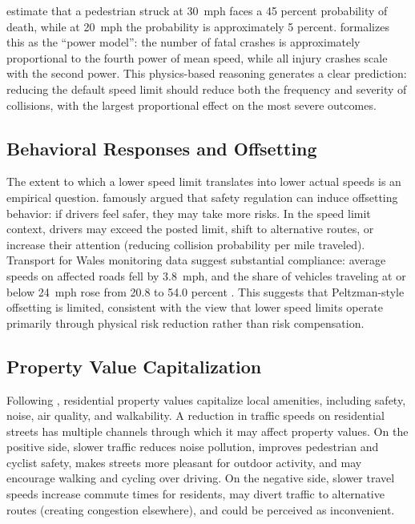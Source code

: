 \documentclass[12pt]{article}
\begin{document}
\citet{rosen2009} estimate that a pedestrian struck at 30~mph faces a 45 percent probability of death, while at 20~mph the probability is approximately 5 percent. \citet{elvik2009} formalizes this as the ``power model'': the number of fatal crashes is approximately proportional to the fourth power of mean speed, while all injury crashes scale with the second power. This physics-based reasoning generates a clear prediction: reducing the default speed limit should reduce both the frequency and severity of collisions, with the largest proportional effect on the most severe outcomes.

\subsection{Behavioral Responses and Offsetting}

The extent to which a lower speed limit translates into lower actual speeds is an empirical question. \citet{peltzman1975} famously argued that safety regulation can induce offsetting behavior: if drivers feel safer, they may take more risks. In the speed limit context, drivers may exceed the posted limit, shift to alternative routes, or increase their attention (reducing collision probability per mile traveled). Transport for Wales monitoring data suggest substantial compliance: average speeds on affected roads fell by 3.8~mph, and the share of vehicles traveling at or below 24~mph rose from 20.8 to 54.0 percent \citep{tfw2025}. This suggests that Peltzman-style offsetting is limited, consistent with the view that lower speed limits operate primarily through physical risk reduction rather than risk compensation.

\subsection{Property Value Capitalization}

Following \citet{rosen1974}, residential property values capitalize local amenities, including safety, noise, air quality, and walkability. A reduction in traffic speeds on residential streets has multiple channels through which it may affect property values. On the positive side, slower traffic reduces noise pollution, improves pedestrian and cyclist safety, makes streets more pleasant for outdoor activity, and may encourage walking and cycling over driving. On the negative side, slower travel speeds increase commute times for residents, may divert traffic to alternative routes (creating congestion elsewhere), and could be perceived as inconvenient.
\end{document}
